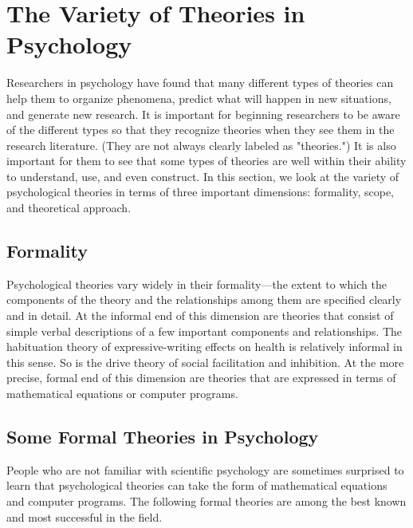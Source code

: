 \newpage
\section{The Variety of Theories in Psychology}


Researchers in psychology have found that many different types of theories can help them to organize phenomena, predict what will happen in new situations, and generate new research. It is important for beginning researchers to be aware of the different types so that they recognize theories when they see them in the research literature. (They are not always clearly labeled as "theories.") It is also important for them to see that some types of theories are well within their ability to understand, use, and even construct. In this section, we look at the variety of psychological theories in terms of three important dimensions: formality, scope, and theoretical approach.

\subsection{Formality}

Psychological theories vary widely in their formality---the extent to which the components of the theory and the relationships among them are specified clearly and in detail. At the informal end of this dimension are theories that consist of simple verbal descriptions of a few important components and relationships. The habituation theory of expressive-writing effects on health is relatively informal in this sense. So is the drive theory of social facilitation and inhibition. At the more precise, formal end of this dimension are theories that are expressed in terms of mathematical equations or computer programs.

\subsection{Some Formal Theories in Psychology}

People who are not familiar with scientific psychology are sometimes surprised to learn that psychological theories can take the form of mathematical equations and computer programs. The following formal theories are among the best known and most successful in the field.

